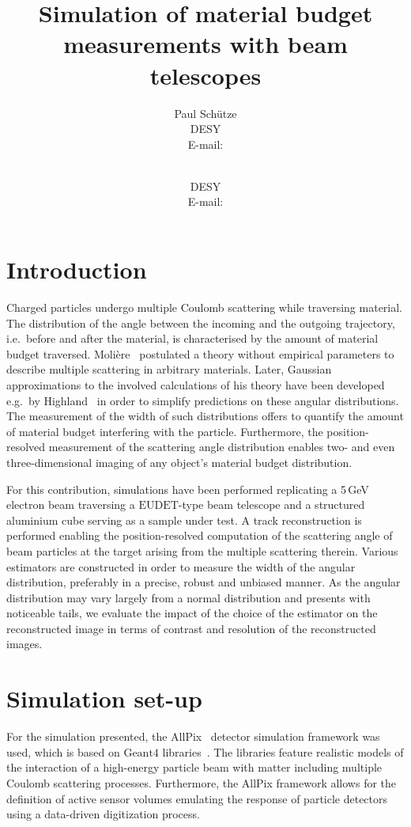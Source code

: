 \documentclass{PoS}
\title{Simulation of material budget measurements with beam telescopes}
\author{Paul Sch\"utze\\
        DESY\\
        E-mail: \email{paul.schuetze@desy.de}}
\author{\speaker{Hendrik Jansen}\\
        DESY\\
        E-mail: \email{hendrik.jansen@desy.de}}
\newcommand{\eudet}{\ensuremath{\textrm{EUDET}}}
\newcommand{\Geant}{\ensuremath{\textrm{Geant4}}}
\begin{document}
\linenumbers
\section{Introduction}
Charged particles undergo multiple Coulomb scattering while traversing material. 
The distribution of the angle between the incoming and the outgoing trajectory, i.e.\ before and after the material, is characterised by the amount of material budget traversed. 
Moli\`ere~\cite{moliere} postulated a theory without empirical parameters to describe multiple scattering in arbitrary materials.
Later, Gaussian approximations to the involved calculations of his theory have been developed e.g.\ by Highland~\cite{ref:scatteringhighland} in order to simplify predictions on these angular distributions.
The measurement of the width of such distributions offers to quantify the amount of material budget interfering with the particle. 
Furthermore, the position-resolved measurement of the scattering angle distribution enables two- and even three-dimensional imaging of any object's material budget distribution.


For this contribution, simulations have been performed replicating a 5\,GeV electron beam traversing a $\eudet$-type beam telescope \cite{JansenEPJ} and a structured aluminium cube serving as a sample under test. 
A track reconstruction is performed enabling the position-resolved computation of the scattering angle of beam particles at the target arising from the multiple scattering therein.
Various estimators are constructed in order to measure the width of the angular distribution, preferably  in a precise, robust and unbiased manner. 
As the angular distribution may vary largely from a normal distribution and presents with noticeable tails,
 we evaluate the impact of the choice of the estimator on the reconstructed image in terms of contrast and resolution of the reconstructed images. 


\section{Simulation set-up}
For the simulation presented, the AllPix~\cite{ref:AllPix} detector simulation framework was used, which is based on $\Geant$ libraries~\cite{Agostinelli2003250,1610988}.
The libraries feature realistic models of the interaction of a high-energy particle beam with matter including multiple Coulomb scattering processes.
Furthermore, the AllPix framework allows for the definition of active sensor volumes emulating the response of particle detectors using a data-driven digitization process. 
\end{document}
